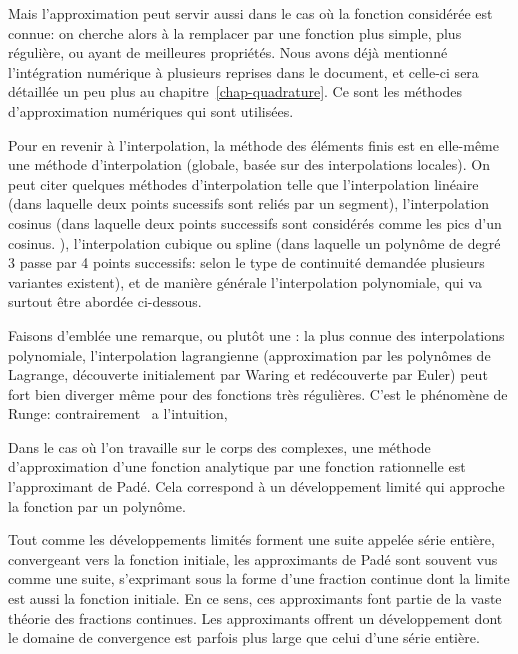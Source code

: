 Mais l'approximation peut servir aussi dans le cas où la fonction considérée est connue:
on cherche alors à la remplacer par une fonction plus simple, plus régulière, ou ayant de meilleures 
propriétés. 
Nous avons déjà mentionné l'intégration numérique à plusieurs reprises dans le document, et 
celle-ci sera détaillée un peu plus au chapitre~\ref{chap-quadrature}. Ce sont les méthodes d'approximation
numériques qui sont utilisées.

\medskip
Pour en revenir à l'interpolation, la méthode des éléments finis est en elle-même une méthode d'interpolation (globale,
basée sur des interpolations locales).
On peut citer quelques méthodes d'interpolation telle que l'interpolation linéaire (dans laquelle deux points
sucessifs sont reliés par un segment), l'interpolation cosinus (dans laquelle deux points successifs sont
considérés comme les pics d'un cosinus. ), l'interpolation cubique ou spline (dans laquelle un polynôme
de degré 3 passe par 4 points successifs: selon le type de continuité demandée plusieurs variantes
existent), et de manière générale l'interpolation polynomiale, qui va surtout être abordée
ci-dessous.

\medskip
Faisons d'emblée une remarque, ou plutôt une : 
la plus connue des interpolations polynomiale, l'interpolation lagrangienne (approximation par les 
polynômes de Lagrange, 
découverte initialement par Waring et redécouverte par 
Euler) peut fort bien diverger même pour des fonctions 
très régulières.
C'est le phénomène de Runge: 
contrairement \ a l'intuition, 

\medskip
{} Dans le cas où l'on travaille sur le corps des complexes, une méthode d'approximation 
d'une fonction analytique par une fonction rationnelle est l'approximant de Padé. 
Cela correspond à un développement limité qui approche la fonction par un polynôme.

Tout comme les développements limités forment une suite appelée série entière, convergeant
 vers la fonction initiale, les approximants de Padé sont souvent vus comme une suite, s'exprimant sous la forme 
d'une fraction continue dont la limite est aussi la fonction initiale. En ce sens, ces approximants font partie de 
la vaste théorie des fractions continues.
Les approximants offrent un développement dont le domaine de convergence est parfois plus large que celui 
d'une série entière. 

